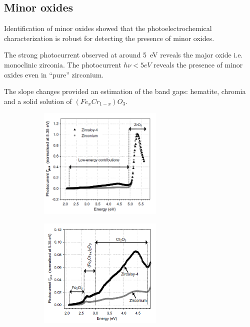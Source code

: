 \documentclass[10pt,compress]{beamer}
\newcommand{\coef}{1}
\begin{document}
\subsection{Minor oxides}
    \begin{frame}{Identification of minor oxides}
        \citet{benaboud2007} showed that the photoelectrochemical characterization 
        is robust for detecting the presence of minor oxides. 
        
        The strong photocurrent observed at around 5~eV 
        reveals the major oxide i.e. monoclinic zirconia. 
        The photocurrent $h\nu < 5 eV$ reveals the presence of minor 
        oxides even in “pure” zirconium. 
        
        The slope changes provided an estimation of the band gaps: 
        hematite, chromia and a solid solution of $(Fe_xCr_{1-x})O_3$. 

        \renewcommand{\coef}{0.45}
        \begin{figure}[h]
            \centering
            \begin{subfigure}{\coef\textwidth}
                \centering
                \includegraphics[width=0.65\textwidth]{./src/figures/Benaboud2007-Fig4.png}
                \caption{}
                \label{fig_benaboud_minor_oxides_a}
            \end{subfigure}
            \begin{subfigure}{\coef\textwidth}
                \centering
                \includegraphics[width=0.65\textwidth]{./src/figures/Benaboud2007-Fig5.png}
                \caption{}
                \label{fig_benaboud_minor_oxides_b}
            \end{subfigure}
            

\end{figure}
\end{frame}
\end{document}

